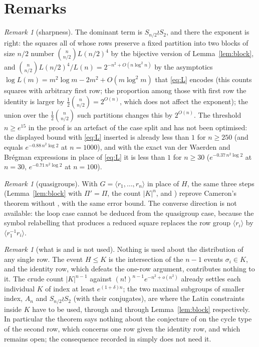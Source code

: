 \documentclass[11pt]{amsart}
\theoremstyle{plain}
\theoremstyle{remark}
\newtheorem{remark}[theorem]{Remark}
\begin{document}
\section{Remarks}

\begin{remark}[sharpness]
The dominant term is $S_{n/2}\wr S_2$, and there the exponent is right:
the squares all of whose rows preserve a fixed partition into two
blocks of size $n/2$ number $\binom n{n/2}L(n/2)^4$ by the bijective
version of Lemma~\ref{lem:block}, and
$\binom n{n/2}L(n/2)^4/L(n)=2^{-n^2+O(n\log^2n)}$ by the asymptotics
$\log L(m)=m^2\log m-2m^2+O(m\log^2m)$ that \eqref{eq:L} encodes
(this counts squares with arbitrary first row; the proportion among those with first row the identity is larger by $\tfrac12\binom{n}{n/2}=2^{O(n)}$, which does not affect the exponent); the
union over the $\frac12\binom n{n/2}$ such partitions changes this by
$2^{O(n)}$.  The threshold $n\ge e^{15}$ in the proof is an artefact of
the case split and has not been optimised: the displayed bound with
\eqref{eq:L} inserted is already less than $1$ for $n\ge250$ (and equals
$e^{-0.88\,n^2\log2}$ at $n=1000$), and with the exact van der Waerden
and Br\'egman expressions in place of \eqref{eq:L} it is less than $1$
for $n\ge30$ ($e^{-0.37\,n^2\log2}$ at $n=30$, $e^{-0.71\,n^2\log 2}$
at $n=100$).
\end{remark}

\begin{remark}[quasigroups]
With $G=\langle r_1,\dots,r_n\rangle$ in place of $H$, the same three
steps (Lemma~\ref{lem:block} with $\Pi'=\Pi$, the count $|K|^n$, and
\cite{HJ96}) reprove Cameron's theorem \cite{Cam92} without
\cite{LP93}, with the same error bound.  The converse direction is not
available: the loop case cannot be deduced from the quasigroup case,
because the symbol relabelling that produces a reduced square replaces
the row group $\langle r_i\rangle$ by $\langle r_1^{-1}r_i\rangle$.
\end{remark}

\begin{remark}[what is and is not used]
Nothing is used about the distribution of any single row.  The event
$H\le K$ is the intersection of the $n-1$ events $\sigma_i\in K$, and the
identity row, which defeats the one-row argument, contributes nothing
to it.  The crude count $|K|^{n-1}$ against $(n!)^{n-1}e^{-n^2+o(n^2)}$
already settles each individual $K$ of index at least
$e^{(1+\delta)n}$; the two maximal subgroups of smaller index, $A_n$
and $S_{n/2}\wr S_2$ (with their conjugates), are where the Latin
constraints inside $K$ have to be used, through \cite{HJ96} and
through Lemma~\ref{lem:block} respectively.  In particular the theorem
says nothing about the conjecture of \cite{CGW08} on the cycle type of
the second row, which concerns one row given the identity row, and
which remains open; the consequence recorded in \cite[Lemma~6.2]{CGW08}
simply does not need it.
\end{remark}
\end{document}
